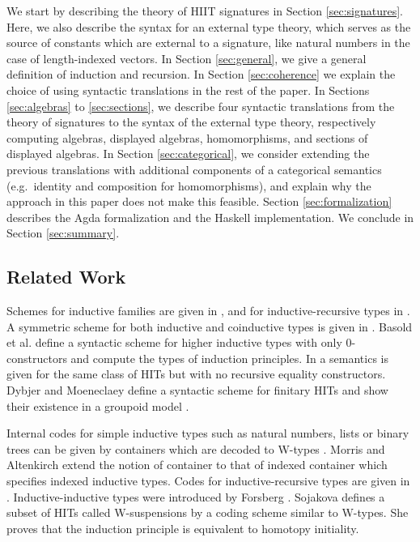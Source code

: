\documentclass[dvipsnames]{lmcs} %
\newcommand{\1}{\mathsf{1}} \renewcommand{\Pr}{\mathsf{Pr}}
\theoremstyle{plain}\newtheorem{satz}[thm]{Satz} %
\begin{document}
We start by describing the theory of HIIT signatures in Section
\ref{sec:signatures}. Here, we also describe the syntax for an external type
theory, which serves as the source of constants which are external to a
signature, like natural numbers in the case of length-indexed vectors. In
Section \ref{sec:general}, we give a general definition of induction and
recursion. In Section \ref{sec:coherence} we explain the choice of using
syntactic translations in the rest of the paper. In Sections \ref{sec:algebras}
to \ref{sec:sections}, we describe four syntactic translations from the theory
of signatures to the syntax of the external type theory, respectively computing
algebras, displayed algebras, homomorphisms, and sections of displayed
algebras. In Section \ref{sec:categorical}, we consider extending the previous
translations with additional components of a categorical semantics
(e.g.\ identity and composition for homomorphisms), and explain why the approach
in this paper does not make this feasible. Section \ref{sec:formalization}
describes the Agda formalization and the Haskell implementation. We conclude in
Section \ref{sec:summary}.

\subsection{Related Work}

Schemes for inductive families are given in
\cite{Dybjer97inductivefamilies,paulinmohring}, and for inductive-recursive
types in \cite{dybjer00ir}. A symmetric scheme for both inductive and
coinductive types is given in \cite{henning}. Basold et al. \cite{niels} define
a syntactic scheme for higher inductive types with only 0-constructors and
compute the types of induction principles. In \cite{nielsmsc} a semantics is
given for the same class of HITs but with no recursive equality
constructors. Dybjer and Moeneclaey define a syntactic scheme for finitary HITs
and show their existence in a groupoid model \cite{moeneclaey}.

Internal codes for simple inductive types such as natural numbers, lists or
binary trees can be given by containers which are decoded to W-types
\cite{abbot05containers}. Morris and Altenkirch \cite{morris09indexed} extend
the notion of container to that of indexed container which specifies indexed
inductive types. Codes for inductive-recursive types are given in
\cite{Dybjer99afinite}. Inductive-inductive types were introduced by Forsberg
\cite{forsberg-phd}. Sojakova \cite{sojakova} defines a subset of HITs called
W-suspensions by a coding scheme similar to W-types. She proves that the
induction principle is equivalent to homotopy initiality.
\end{document}
